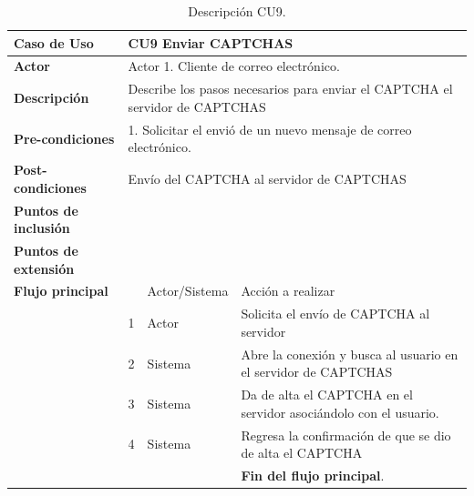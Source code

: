 \begin{table}[H]
 \centering
   {
     \begin{tabular}{| p{} | p{} |p{4cm}|p{5cm}|}
     \hline
     \textbf{Caso de Uso} &\multicolumn{3}{|l|}{CU9 Enviar CAPTCHAS}\\
     \hline
     \textbf{Actor} & \multicolumn{3}{|l|}{Actor 1. Cliente de correo electrónico.}\\
     \hline
     \textbf{Descripción} & \multicolumn{3}{|p{10cm}|}{Describe los pasos necesarios para enviar el CAPTCHA el servidor de CAPTCHAS}\\
     \hline
     \textbf{Pre-condiciones} & \multicolumn{3}{|l|}{1. Solicitar el envió de un nuevo mensaje de correo electrónico.}\\
     \hline
     \textbf{Post-condiciones} & \multicolumn{3}{|l|}{Envío del CAPTCHA al servidor de CAPTCHAS}\\
     \hline
     \textbf{Puntos de inclusión} & \multicolumn{3}{|l|}{}\\
     \hline
     \textbf{Puntos de extensión} & \multicolumn{3}{|l|}{}\\
     \hline
     \textbf{Flujo principal} & & Actor/Sistema & Acción a realizar\\
     \hline
     & 1 & Actor & Solicita el envío de CAPTCHA al servidor\\
     \hline
     & 2 & Sistema & Abre la conexión y busca al usuario en el servidor de CAPTCHAS\\
     \hline
     & 3 & Sistema & Da de alta el CAPTCHA en el servidor asociándolo con el usuario.\\
     \hline
     & 4 & Sistema & Regresa la confirmación de que se dio de alta el CAPTCHA\\
     \hline
     & & & \textbf{Fin del flujo principal}.\\
         
     \end{tabular}
    }
    \caption{Descripción CU9.}
    \label{tabla:CU9}
\end{table}


\pagebreak
